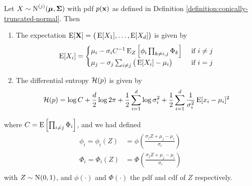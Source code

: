 \begin{lemma}\label{lem:expectation-entropy-truncated-mvn}
  Let $X \sim \N^{(j)}(\bmu, \bSigma)$ with pdf $p(\bx)$ as defined in Definition \ref{definition:conically-truncated-normal}. Then
  \begin{enumerate}[label=(\roman*)]
    \item The expectation $\E[\bX] = \big(\E[X_1], \dots, \E[X_d] \big)$ is given by
    \[
      \E[X_i] =
      \begin{cases}
        \mu_i - \sigma_i C^{-1} \E_Z\left[\phi_i \prod_{k \neq i,j} \Phi_k \right] 
        &\text{ if } i \neq j \\
        \mu_j - \sigma_j \sum_{i \neq j} \big(\E[X_i] - \mu_i \big) &\text{ if } i = j \\
      \end{cases}
    \]
    \item The differential entropy $\cH(p)$ is given by
    \[
    \cH(p) = \log C + \half[d] \log 2\pi + \half \sum_{i=1}^d \log \sigma_i^2 + \half \sum_{i=1}^d \frac{1}{\sigma_i^2} \E [ x_i - \mu_i ]^2
    \]
  \end{enumerate} 
  where $C = \E \left[ \prod_{i \neq j} \Phi_i \right]$, and we had defined
  \begin{align*}
    \phi_i = \phi_i(Z) &= \phi \left( \frac{\sigma_j Z + \mu_j - \mu_i}{\sigma_i} \right) \\
    \Phi_i = \Phi_i(Z) &= \Phi \left( \frac{\sigma_j Z + \mu_j - \mu_i}{\sigma_i} \right) \\    
  \end{align*}
  with $Z \sim \N(0,1)$, and $\phi(\cdot)$ and $\Phi(\cdot)$ the pdf and cdf of $Z$ respectively.
\end{lemma}